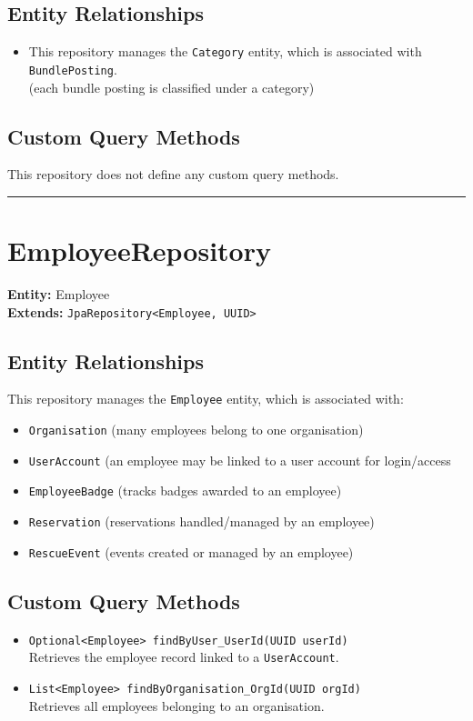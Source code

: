 \documentclass[12pt]{article}
\begin{document}
\subsection*{Entity Relationships}
\begin{itemize}
    \item This repository manages the \texttt{Category} entity, which is associated with \texttt{BundlePosting}. \\
    (each bundle posting is classified under a category)
    
\end{itemize}

\subsection*{Custom Query Methods}
This repository does not define any custom query methods.

\hrule
\vspace{1em}

\section{EmployeeRepository}

\textbf{Entity:} Employee \\
\textbf{Extends:} \texttt{JpaRepository<Employee, UUID>}

\subsection*{Entity Relationships}
This repository manages the \texttt{Employee} entity, which is associated with:
\begin{itemize}
    \item \texttt{Organisation} (many employees belong to one organisation)
    \item \texttt{UserAccount} (an employee may be linked to a user account for login/access

    \item \texttt{EmployeeBadge} (tracks badges awarded to an employee)
    \item \texttt{Reservation} (reservations handled/managed by an employee)
    \item \texttt{RescueEvent} (events created or managed by an employee)
\end{itemize}

\subsection*{Custom Query Methods}
\begin{itemize}
    \item \texttt{Optional<Employee> findByUser\_UserId(UUID userId)} \\
    Retrieves the employee record linked to a \texttt{UserAccount}.

    \item \texttt{List<Employee> findByOrganisation\_OrgId(UUID orgId)} \\
    Retrieves all employees belonging to an organisation.
\end{itemize}
\end{document}
